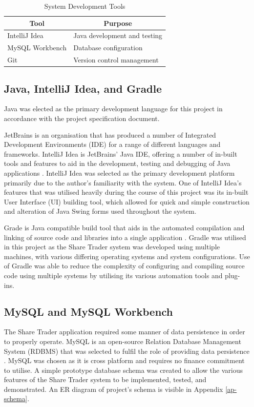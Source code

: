 \documentclass[12pt, a4paper,titlepage]{article}
\begin{document}
\begin{table}[h]
    \centering
    \begin{tabular}{|l|l|}
        \hline
        \multicolumn{1}{|c|}{\textbf{Tool}} &
        \multicolumn{1}{c|}{\textbf{Purpose}} \\ \hline
        IntelliJ Idea                       & Java development and testing
        \\ \hline
        MySQL Workbench                     & Database configuration
        \\ \hline
        Git                                 & Version control management
        \\ \hline
    \end{tabular}
    \caption{System Development Tools}
    \label{table-tool}
\end{table}


\subsection{Java, IntelliJ Idea, and Gradle}
Java was elected as the primary development language for this project in
accordance with the project specification document.

JetBrains is an organisation that has produced a number of Integrated
Development Environments (IDE) for a range of different languages and
frameworks.
IntelliJ Idea is JetBrains' Java IDE, offering a number of in-built tools and
features to aid in the development, testing and debugging of Java
applications \cite{Idea}.
IntelliJ Idea was selected as the primary development platform primarily due to
the author's familiarity with the system.
One of IntelliJ Idea's features that was utilised heavily during the course
of this project was its in-built User Interface (UI) building tool, which
allowed for quick and simple construction and alteration of Java Swing forms
used throughout the system.

Grade is Java compatible build tool that aids in the automated compilation
and linking of source code and libraries into a single application
\cite{Gradle}.
Gradle was utilised in this project as the Share Trader system was developed
using multiple machines, with various differing operating systems and system
configurations.
Use of Gradle was able to reduce the complexity of configuring and compiling
source code using multiple systems by utilising its various automation tools and
plug-ins.

\subsection{MySQL and MySQL Workbench}
The Share Trader application required some manner of data persistence in order
to properly operate.
MySQL is an open-source Relation Database Management System (RDBMS) that was
selected to fulfil the role of providing data persistence \cite{Mysql}.
MySQL was chosen as it is cross platform and requires no finance commitment
to utilise.
A simple prototype database schema was created to allow the various features
of the Share Trader system to be implemented, tested, and demonstrated.
An ER diagram of project's schema is visible in Appendix \ref{ap-schema}.
\end{document}
